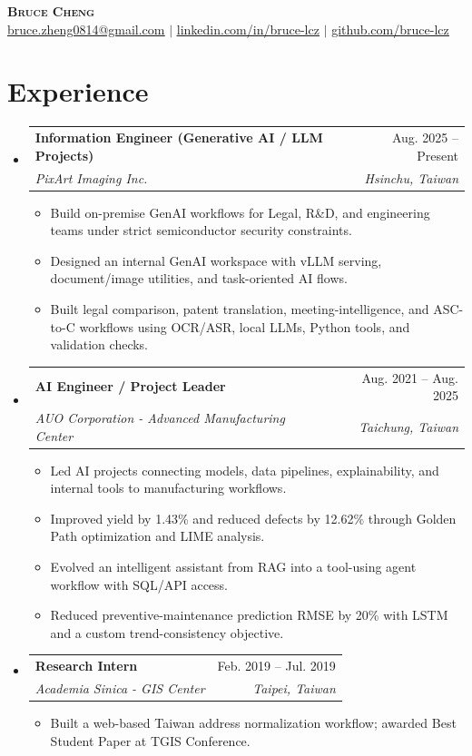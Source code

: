 \documentclass[letterpaper,11pt]{article}
\makeatletter
\newcommand{\resumeItem}[1]{
  \item\small{
    {#1 \vspace{-2pt}}
  }
}
\newcommand{\resumeSubheading}[4]{
  \vspace{-2pt}\item
    \begin{tabular*}{0.97\textwidth}[t]{l@{\extracolsep{\fill}}r}
      \textbf{#1} & #2 \\
      \textit{\small#3} & \textit{\small #4} \\
    \end{tabular*}\vspace{-7pt}
}
\newcommand{\resumeSubHeadingListStart}{\begin{itemize}[leftmargin=0.15in, label={}, itemsep=0pt]}
\newcommand{\resumeSubHeadingListEnd}{\end{itemize}}
\newcommand{\resumeItemListStart}{\begin{itemize}[itemsep=0pt]}
\newcommand{\resumeItemListEnd}{\end{itemize}\vspace{-5pt}}
\makeatother
\begin{document}
\begin{center}
    \textbf{\Huge \scshape Bruce Cheng} \\ \vspace{1pt}
    \small \href{mailto:bruce.zheng0814@gmail.com}{\underline{bruce.zheng0814@gmail.com}} $|$
    \href{https://linkedin.com/in/bruce-lcz}{\underline{linkedin.com/in/bruce-lcz}} $|$
    \href{https://github.com/bruce-lcz}{\underline{github.com/bruce-lcz}}
\end{center}

\section{Experience}
  \resumeSubHeadingListStart

    \resumeSubheading
      {Information Engineer (Generative AI / LLM Projects)}{Aug. 2025 -- Present}
      {PixArt Imaging Inc.}{Hsinchu, Taiwan}
      \resumeItemListStart
        \resumeItem{Build on-premise GenAI workflows for Legal, R\&D, and engineering teams under strict semiconductor security constraints.}
        \resumeItem{Designed an internal GenAI workspace with vLLM serving, document/image utilities, and task-oriented AI flows.}
        \resumeItem{Built legal comparison, patent translation, meeting-intelligence, and ASC-to-C workflows using OCR/ASR, local LLMs, Python tools, and validation checks.}
      \resumeItemListEnd

    \resumeSubheading
      {AI Engineer / Project Leader}{Aug. 2021 -- Aug. 2025}
      {AUO Corporation - Advanced Manufacturing Center}{Taichung, Taiwan}
      \resumeItemListStart
        \resumeItem{Led AI projects connecting models, data pipelines, explainability, and internal tools to manufacturing workflows.}
        \resumeItem{Improved yield by 1.43\% and reduced defects by 12.62\% through Golden Path optimization and LIME analysis.}
        \resumeItem{Evolved an intelligent assistant from RAG into a tool-using agent workflow with SQL/API access.}
        \resumeItem{Reduced preventive-maintenance prediction RMSE by 20\% with LSTM and a custom trend-consistency objective.}
      \resumeItemListEnd

    \resumeSubheading
      {Research Intern}{Feb. 2019 -- Jul. 2019}
      {Academia Sinica - GIS Center}{Taipei, Taiwan}
      \resumeItemListStart
        \resumeItem{Built a web-based Taiwan address normalization workflow; awarded Best Student Paper at TGIS Conference.}
      \resumeItemListEnd

  \resumeSubHeadingListEnd
\end{document}
